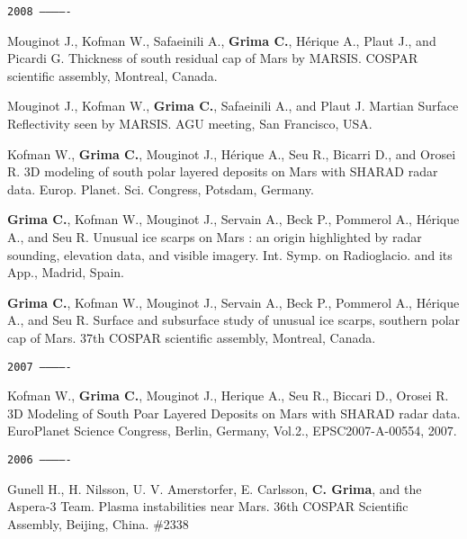 \begin{etaremune}
\hspace{-2em}\texttt{2008 -------------}

\item
  Mouginot J., Kofman W., Safaeinili A., \textbf{Grima C.}, Hérique A.,
  Plaut J., and Picardi G. Thickness of south residual cap of Mars by
  MARSIS. COSPAR scientific assembly, Montreal, Canada.
\item
  Mouginot J., Kofman W., \textbf{Grima C.}, Safaeinili A., and Plaut J.
  Martian Surface Reflectivity seen by MARSIS. AGU meeting, San
  Francisco, USA.
\item
  Kofman W., \textbf{Grima C.}, Mouginot J., Hérique A., Seu R., Bicarri
  D., and Orosei R. 3D modeling of south polar layered deposits on Mars
  with SHARAD radar data. Europ. Planet. Sci. Congress, Potsdam,
  Germany.
\item
  \textbf{Grima C.}, Kofman W., Mouginot J., Servain A., Beck P.,
  Pommerol A., Hérique A., and Seu R. Unusual ice scarps on Mars : an
  origin highlighted by radar sounding, elevation data, and visible
  imagery. Int. Symp. on Radioglacio. and its App., Madrid, Spain.
\item
  \textbf{Grima C.}, Kofman W., Mouginot J., Servain A., Beck P.,
  Pommerol A., Hérique A., and Seu R. Surface and subsurface study of
  unusual ice scarps, southern polar cap of Mars. 37th COSPAR scientific
  assembly, Montreal, Canada.

\hspace{-2em}\texttt{2007 -------------}

\item
  Kofman W., \textbf{Grima C.}, Mouginot J., Herique A., Seu R., Biccari
  D., Orosei R. 3D Modeling of South Poar Layered Deposits on Mars with
  SHARAD radar data. EuroPlanet Science Congress, Berlin, Germany,
  Vol.2., EPSC2007-A-00554, 2007.

\hspace{-2em}\texttt{2006 -------------}

\item
  Gunell H., H. Nilsson, U. V. Amerstorfer, E. Carlsson, \textbf{C. Grima}, and
  the Aspera-3 Team. Plasma instabilities near Mars. 36th COSPAR
  Scientific Assembly, Beijing, China. \#2338
  
\end{etaremune}